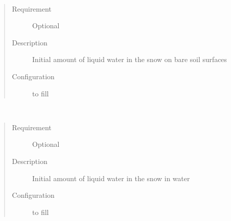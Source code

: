 \documentclass[letterpaper,10pt,english]{sphinxmanual}
\begin{document}
\begin{fulllineitems}
\label{\detokenize{input_files/Initial_Conditions/Snow_related_parameters:cmdoption-arg-snowwaterbsoilstate}}~\begin{quote}\begin{description}
\item[{Requirement}] \leavevmode
Optional

\item[{Description}] \leavevmode
Initial amount of liquid water in the snow on bare soil surfaces

\item[{Configuration}] \leavevmode
to fill

\end{description}\end{quote}

\end{fulllineitems}


\begin{fulllineitems}
\label{\detokenize{input_files/Initial_Conditions/Snow_related_parameters:cmdoption-arg-snowwaterwaterstate}}~\begin{quote}\begin{description}
\item[{Requirement}] \leavevmode
Optional

\item[{Description}] \leavevmode
Initial amount of liquid water in the snow in water

\item[{Configuration}] \leavevmode
to fill

\end{description}\end{quote}

\end{fulllineitems}

\end{document}
